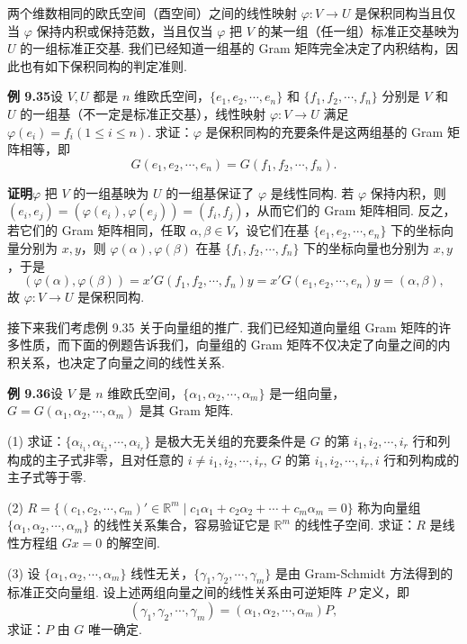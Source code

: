\documentclass[UTF8,12pt,a4paper,fontset=fandol]{ctexart}
\begin{document}
两个维数相同的欧氏空间（酉空间）之间的线性映射 $\varphi:V\to U$ 是保积同构当且仅当 $\varphi$ 保持内积或保持范数，当且仅当 $\varphi$ 把 $V$ 的某一组（任一组）标准正交基映为 $U$ 的一组标准正交基. 我们已经知道一组基的 Gram 矩阵完全决定了内积结构，因此也有如下保积同构的判定准则.

\noindent\textbf{例 9.35}\quad 设 $V,U$ 都是 $n$ 维欧氏空间，$\{e_1,e_2,\cdots,e_n\}$ 和 $\{f_1,f_2,\cdots,f_n\}$ 分别是 $V$ 和 $U$ 的一组基（不一定是标准正交基），线性映射 $\varphi:V\to U$ 满足 $\varphi(e_i)=f_i(1\le i\le n)$. 求证：$\varphi$ 是保积同构的充要条件是这两组基的 Gram 矩阵相等，即
\[
G(e_1,e_2,\cdots,e_n)=G(f_1,f_2,\cdots,f_n).
\]

\noindent\textbf{证明}\quad $\varphi$ 把 $V$ 的一组基映为 $U$ 的一组基保证了 $\varphi$ 是线性同构. 若 $\varphi$ 保持内积，则 $(e_i,e_j)=(\varphi(e_i),\varphi(e_j))=(f_i,f_j)$，从而它们的 Gram 矩阵相同. 反之，若它们的 Gram 矩阵相同，任取 $\alpha,\beta\in V$，设它们在基 $\{e_1,e_2,\cdots,e_n\}$ 下的坐标向量分别为 $x,y$，则 $\varphi(\alpha),\varphi(\beta)$ 在基 $\{f_1,f_2,\cdots,f_n\}$ 下的坐标向量也分别为 $x,y$，于是
\[
(\varphi(\alpha),\varphi(\beta))=x'G(f_1,f_2,\cdots,f_n)y=x'G(e_1,e_2,\cdots,e_n)y=(\alpha,\beta),
\]
故 $\varphi:V\to U$ 是保积同构.

接下来我们考虑例 9.35 关于向量组的推广. 我们已经知道向量组 Gram 矩阵的许多性质，而下面的例题告诉我们，向量组的 Gram 矩阵不仅决定了向量之间的内积关系，也决定了向量之间的线性关系.

\noindent\textbf{例 9.36}\quad 设 $V$ 是 $n$ 维欧氏空间，$\{\alpha_1,\alpha_2,\cdots,\alpha_m\}$ 是一组向量，$G=G(\alpha_1,\alpha_2,\cdots,\alpha_m)$ 是其 Gram 矩阵.

(1) 求证：$\{\alpha_{i_1},\alpha_{i_2},\cdots,\alpha_{i_r}\}$ 是极大无关组的充要条件是 $G$ 的第 $i_1,i_2,\cdots,i_r$ 行和列构成的主子式非零，且对任意的 $i\ne i_1,i_2,\cdots,i_r$, $G$ 的第 $i_1,i_2,\cdots,i_r,i$ 行和列构成的主子式等于零.

(2) $R=\{(c_1,c_2,\cdots,c_m)'\in\mathbb{R}^m\mid c_1\alpha_1+c_2\alpha_2+\cdots+c_m\alpha_m=0\}$ 称为向量组 $\{\alpha_1,\alpha_2,\cdots,\alpha_m\}$ 的线性关系集合，容易验证它是 $\mathbb{R}^m$ 的线性子空间. 求证：$R$ 是线性方程组 $Gx=0$ 的解空间.

(3) 设 $\{\alpha_1,\alpha_2,\cdots,\alpha_m\}$ 线性无关，$\{\gamma_1,\gamma_2,\cdots,\gamma_m\}$ 是由 Gram-Schmidt 方法得到的标准正交向量组. 设上述两组向量之间的线性关系由可逆矩阵 $P$ 定义，即
\[
(\gamma_1,\gamma_2,\cdots,\gamma_m)=(\alpha_1,\alpha_2,\cdots,\alpha_m)P,
\]
求证：$P$ 由 $G$ 唯一确定.
\end{document}
